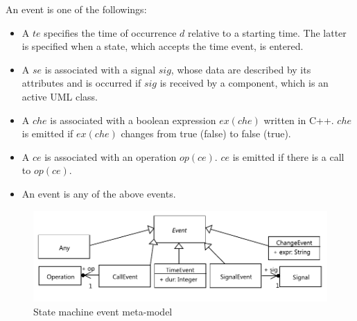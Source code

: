 \begin{definition} An event is one of the followings:
	\begin{itemize}
		\item A  $te$ specifies the time of occurrence $d$ relative to a starting time. The latter is specified when a state, which accepts the time event, is entered.
		
		\item A  $se$ is associated with a signal $sig$, whose data are described by its attributes and is occurred if $sig$ is received by a component, which is an active UML class.
		
		\item A  $che$ is associated with a boolean expression $ex(che)$ written in C++. $che$ is emitted if $ex(che)$ changes from true (false) to false (true).
		
		\item A  $ce$ is associated with an operation $op(ce)$. $ce$ is emitted if there is a call to $op(ce)$.
		
		\item An  event is any of the above events.
	\end{itemize}
\end{definition}


\begin{figure}
	\centering
	\includegraphics[clip, trim=0.2cm 0.2cm 0.2cm 0.2cm, width=1.0\columnwidth]{figures/eventmetamodel.pdf}
	\caption{State machine event meta-model} 
	\label{fig:eventmetamodel}
\end{figure}


